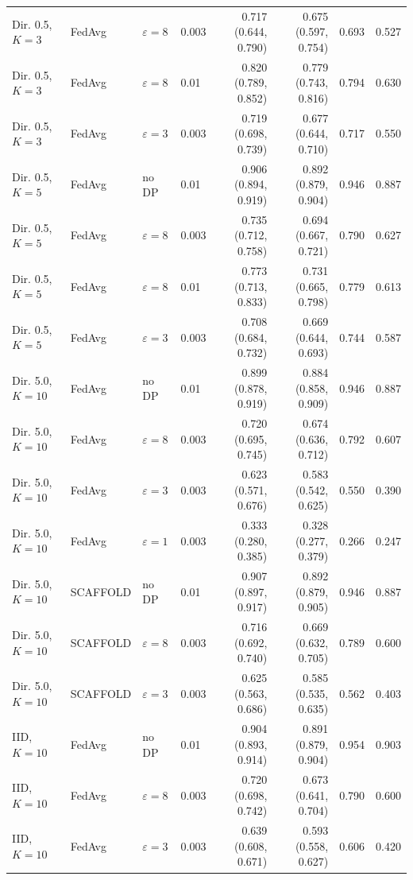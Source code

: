 {\begin{longtable}{llllrrrr}
Dir. 0.5, $K{=}3$ & FedAvg & $\varepsilon=8$ & 0.003 & 0.717 (0.644, 0.790) & 0.675 (0.597, 0.754) & 0.693 & 0.527 \\
Dir. 0.5, $K{=}3$ & FedAvg & $\varepsilon=8$ & 0.01 & 0.820 (0.789, 0.852) & 0.779 (0.743, 0.816) & 0.794 & 0.630 \\
Dir. 0.5, $K{=}3$ & FedAvg & $\varepsilon=3$ & 0.003 & 0.719 (0.698, 0.739) & 0.677 (0.644, 0.710) & 0.717 & 0.550 \\
Dir. 0.5, $K{=}5$ & FedAvg & no DP & 0.01 & 0.906 (0.894, 0.919) & 0.892 (0.879, 0.904) & 0.946 & 0.887 \\
Dir. 0.5, $K{=}5$ & FedAvg & $\varepsilon=8$ & 0.003 & 0.735 (0.712, 0.758) & 0.694 (0.667, 0.721) & 0.790 & 0.627 \\
Dir. 0.5, $K{=}5$ & FedAvg & $\varepsilon=8$ & 0.01 & 0.773 (0.713, 0.833) & 0.731 (0.665, 0.798) & 0.779 & 0.613 \\
Dir. 0.5, $K{=}5$ & FedAvg & $\varepsilon=3$ & 0.003 & 0.708 (0.684, 0.732) & 0.669 (0.644, 0.693) & 0.744 & 0.587 \\
Dir. 5.0, $K{=}10$ & FedAvg & no DP & 0.01 & 0.899 (0.878, 0.919) & 0.884 (0.858, 0.909) & 0.946 & 0.887 \\
Dir. 5.0, $K{=}10$ & FedAvg & $\varepsilon=8$ & 0.003 & 0.720 (0.695, 0.745) & 0.674 (0.636, 0.712) & 0.792 & 0.607 \\
Dir. 5.0, $K{=}10$ & FedAvg & $\varepsilon=3$ & 0.003 & 0.623 (0.571, 0.676) & 0.583 (0.542, 0.625) & 0.550 & 0.390 \\
Dir. 5.0, $K{=}10$ & FedAvg & $\varepsilon=1$ & 0.003 & 0.333 (0.280, 0.385) & 0.328 (0.277, 0.379) & 0.266 & 0.247 \\
Dir. 5.0, $K{=}10$ & SCAFFOLD & no DP & 0.01 & 0.907 (0.897, 0.917) & 0.892 (0.879, 0.905) & 0.946 & 0.887 \\
Dir. 5.0, $K{=}10$ & SCAFFOLD & $\varepsilon=8$ & 0.003 & 0.716 (0.692, 0.740) & 0.669 (0.632, 0.705) & 0.789 & 0.600 \\
Dir. 5.0, $K{=}10$ & SCAFFOLD & $\varepsilon=3$ & 0.003 & 0.625 (0.563, 0.686) & 0.585 (0.535, 0.635) & 0.562 & 0.403 \\
IID, $K{=}10$ & FedAvg & no DP & 0.01 & 0.904 (0.893, 0.914) & 0.891 (0.879, 0.904) & 0.954 & 0.903 \\
IID, $K{=}10$ & FedAvg & $\varepsilon=8$ & 0.003 & 0.720 (0.698, 0.742) & 0.673 (0.641, 0.704) & 0.790 & 0.600 \\
IID, $K{=}10$ & FedAvg & $\varepsilon=3$ & 0.003 & 0.639 (0.608, 0.671) & 0.593 (0.558, 0.627) & 0.606 & 0.420 \\

\end{longtable}}
